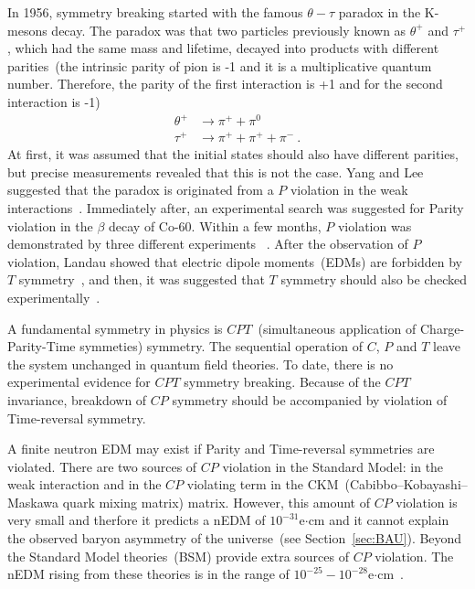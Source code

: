 In 1956, symmetry breaking started with the famous $\theta-\tau$
paradox in the K-mesons decay. The paradox was that two particles
previously known as $\theta^+$ and $\tau^+$, which had the same mass
and lifetime, decayed into products with different parities~(the
intrinsic parity of pion is -1 and it is a multiplicative quantum
number. Therefore, the parity of the first interaction is +1 and for
the second interaction is -1)
\begin{equation}
  \begin{split}
    \theta^+ &\rightarrow \pi^+ + \pi^0 \\
    \tau^+ &\rightarrow \pi^+ + \pi^+ + \pi^-~.
  \end{split}
\end{equation}
At first, it was assumed that the initial states should also have
different parities, but precise measurements revealed that this is not
the case. Yang and Lee suggested that the paradox is originated from a
$P$ violation in the weak
interactions~\cite{lee1957parity}. Immediately after, an experimental
search was suggested for Parity violation in the $\beta$ decay of
Co-60. Within a few months, $P$ violation was demonstrated by three
different experiments
~\cite{PhysRev.105.1413,PhysRev.105.1415,friedman1957nuclear}. After
the observation of $P$ violation, Landau showed that electric dipole
moments~(EDMs) are forbidden by $T$
symmetry~\cite{landau1957conservation}, and then, it was suggested
that $T$ symmetry should also be checked
experimentally~\cite{PhysRev.106.517}.

A fundamental symmetry in physics is $CPT$~(simultaneous application
of Charge-Parity-Time symmeties) symmetry. The sequential operation of
$C$, $P$ and $T$ leave the system unchanged in quantum field
theories. To date, there is no experimental evidence for $CPT$
symmetry breaking. Because of the $CPT$ invariance, breakdown of $CP$
symmetry should be accompanied by violation of Time-reversal symmetry.




A finite neutron EDM may exist if Parity and Time-reversal symmetries
are violated. There are two sources of $CP$ violation in the Standard
Model: in the weak interaction and in the $CP$ violating term in the
CKM~(Cabibbo–Kobayashi–Maskawa quark mixing matrix) matrix. However,
this amount of $CP$ violation is very small and therfore it predicts a
nEDM of $10^{-31}$e$\cdot$cm and it cannot explain the observed baryon
asymmetry of the universe~(see Section~\ref{sec:BAU}). Beyond the
Standard Model theories~(BSM) provide extra sources of $CP$
violation. The nEDM rising from these theories is in the range of
$10^{-25}-10^{-28}$e$\cdot$cm~\cite{pospelov2005electric}.






